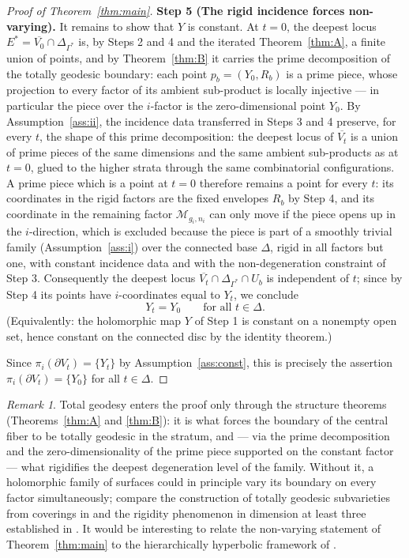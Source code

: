 \documentclass[11pt]{amsart}
\theoremstyle{definition}
\theoremstyle{remark}
\newtheorem{remark}[theorem]{Remark}
\newcommand{\M}{\mathcal{M}}
\begin{document}
\begin{proof}[Proof of Theorem~\ref{thm:main}]
\medskip
\noindent\textbf{Step 5 (The rigid incidence forces non-varying).}
It remains to show that $Y$ is constant. At $t=0$, the deepest locus
$E^*=\overline{V_0}\cap\Delta_{\Gamma^*}$ is, by Steps 2 and 4 and the
iterated Theorem~\ref{thm:A}, a finite union of points, and by
Theorem~\ref{thm:B} it carries the prime decomposition of the totally
geodesic boundary: each point $p_b=(Y_0,R_b)$ is a prime piece, whose
projection to every factor of its ambient sub-product is locally injective
--- in particular the piece over the $i$-factor is the zero-dimensional
point $Y_0$. By Assumption~\ref{ass:ii}, the incidence data transferred in
Steps 3 and 4 preserve, for every $t$, the shape of this prime
decomposition: the deepest locus of $\overline{V_t}$ is a union of prime
pieces of the same dimensions and the same ambient sub-products as at
$t=0$, glued to the higher strata through the same combinatorial
configurations. A prime piece which is a point at $t=0$ therefore remains a
point for every $t$: its coordinates in the rigid factors are the fixed
envelopes $R_b$ by Step 4, and its coordinate in the remaining factor
$\M_{g_i,n_i}$ can only move if the piece opens up in the $i$-direction,
which is excluded because the piece is part of a smoothly trivial family
(Assumption~\ref{ass:i}) over the connected base $\Delta$, rigid in all
factors but one, with constant incidence data and with the non-degeneration
constraint of Step 3. Consequently the deepest locus
$\overline{V_t}\cap\Delta_{\Gamma^*}\cap U_b$ is independent of $t$; since
by Step 4 its points have $i$-coordinates equal to $Y_t$, we conclude
\[
Y_t=Y_0\qquad\text{for all }t\in\Delta .
\]
(Equivalently: the holomorphic map $Y$ of Step 1 is constant on a nonempty
open set, hence constant on the connected disc by the identity theorem.)

Since $\pi_i(\partial V_t)=\{Y_t\}$ by Assumption~\ref{ass:const}, this is
precisely the assertion
$\pi_i(\partial V_t)=\{Y_0\}$ for all $t\in\Delta$.
\end{proof}

\begin{remark}
Total geodesy enters the proof only through the structure theorems
(Theorems~\ref{thm:A} and \ref{thm:B}): it is what forces the boundary of
the central fiber to be totally geodesic in the stratum, and --- via the
prime decomposition and the zero-dimensionality of the prime piece
supported on the constant factor --- what rigidifies the deepest
degeneration level of the family. Without it, a holomorphic family of
surfaces could in principle vary its boundary on every factor
simultaneously; compare the construction of totally geodesic subvarieties
from coverings in \cite{Cubic} and the rigidity phenomenon in dimension at
least three established in \cite{ThreeD}. It would be interesting to relate
the non-varying statement of Theorem~\ref{thm:main} to the hierarchically
hyperbolic framework of \cite{AW}.
\end{remark}
\end{document}
